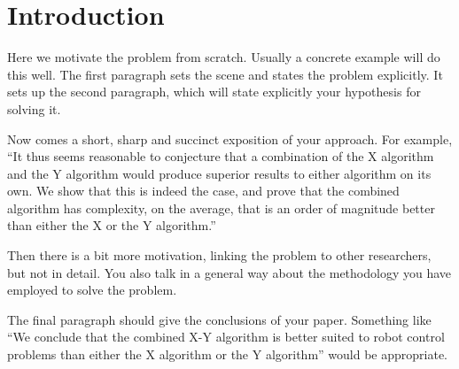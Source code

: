 \section{Introduction}

Here we motivate the problem from scratch. Usually a concrete
example will do this well. The first paragraph sets the scene
and states the problem explicitly. It sets up the second paragraph,
which will state explicitly your hypothesis for solving it.

Now comes a short, sharp and succinct exposition of your approach.
For example, ``It thus seems reasonable to conjecture that a
combination of the X algorithm and the Y algorithm would produce
superior results to either algorithm on its own. We show that this is
indeed the case, and prove that the combined algorithm has complexity,
on the average, that is an order of magnitude better than either the X
or the Y algorithm.''

Then there is a bit more motivation, linking the problem to other
researchers, but not in detail. You also talk in a general way about
the methodology you have employed to solve the problem.

The final paragraph should give the conclusions of your
paper. Something like ``We conclude that the combined X-Y algorithm is
better suited to robot control problems than either the X algorithm or
the Y algorithm'' would be appropriate.

